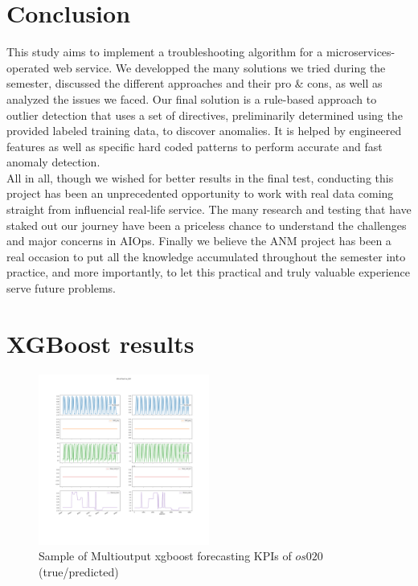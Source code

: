 \documentclass[acmsmall, screen, nonacm]{acmart}
\begin{document}
\section{Conclusion}
This study aims to implement a troubleshooting algorithm for a microservices-operated web service. 
We developped the many solutions we tried during the semester, discussed the different approaches and their pro \& cons, as well as analyzed the issues we faced. 
Our final solution is a rule-based approach to outlier detection that uses a set of directives, preliminarily determined using the provided labeled training data, to discover anomalies. 
It is helped by engineered features as well as specific hard coded patterns to perform accurate and fast anomaly detection. 
\\
All in all, though we wished for better results in the final test, conducting this project has been an unprecedented opportunity to work with real data coming straight from influencial real-life service. 
The many research and testing that have staked out our journey have been a priceless chance to understand the challenges and major concerns in AIOps. 
Finally we believe the ANM project has been a real occasion to put all the knowledge accumulated throughout the semester into practice, and more importantly, to let this practical and truly valuable experience serve future problems.   






\appendix
\section{XGBoost results}\label{sec:appendix_xgboost}
\begin{figure}[h!]
  \centering
  \includegraphics[width=0.5\textwidth]{images/multioutput_xgboost_os020.png}
  \caption{Sample of Multioutput xgboost forecasting KPIs of $os020$ (true/predicted)}
  \label{fig:xgboost}
\end{figure}
\end{document}
